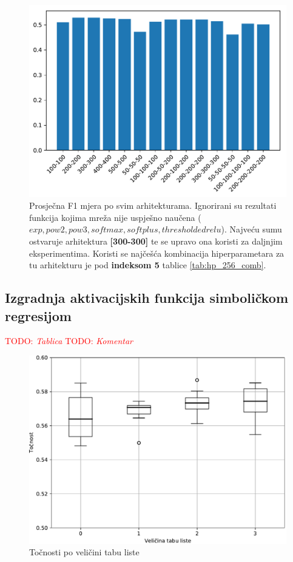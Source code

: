 \documentclass[times, utf8, numeric, diplomski]{fer}
\def\TODO#1{\noindent\textcolor{red}{TODO: \textit{#1}}\newline}
\def\todo#1{\TODO{#1}}
\begin{document}
\begin{figure}[ht]
\includegraphics[width=.8\textwidth]{greedy_256_arch_quality.pdf}
\centering
\caption{Prosječna F1 mjera po svim arhitekturama. Ignorirani su rezultati funkcija kojima mreža nije uspješno naučena ($exp,pow2,pow3,softmax,softplus,thresholdedrelu$). Najveću sumu ostvaruje arhitektura \textbf{[300-300]} te se upravo ona koristi za daljnjim eksperimentima. Koristi se najčešća kombinacija hiperparametara za tu arhitekturu je pod \textbf{indeksom 5} tablice \ref{tab:hp_256_comb}.}
\label{fig:greedy_256_arch_quality}
\end{figure}

\clearpage

\subsection{Izgradnja aktivacijskih funkcija simboličkom regresijom}

\todo{Tablica}
\todo{Komentar}

\begin{figure}[H]
\includegraphics[width=\textwidth]{GP_256class_acc.pdf}
\centering
\caption{Točnosti po veličini tabu liste}
\label{fig:gp_256_acc}
\end{figure}
\end{document}
